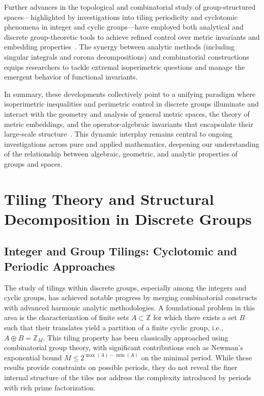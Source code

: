Further advances in the topological and combinatorial study of group-structured spaces—highlighted by investigations into tiling periodicity and cyclotomic phenomena in integer and cyclic groups—have employed both analytical and discrete group-theoretic tools to achieve refined control over metric invariants and embedding properties~\cite{ref52}. The synergy between analytic methods (including singular integrals and corona decompositions) and combinatorial constructions equips researchers to tackle extremal isoperimetric questions and manage the emergent behavior of functional invariants.

In summary, these developments collectively point to a unifying paradigm where isoperimetric inequalities and perimetric control in discrete groups illuminate and interact with the geometry and analysis of general metric spaces, the theory of metric embeddings, and the operator-algebraic invariants that encapsulate their large-scale structure~\cite{ref51,ref52,ref108}. This dynamic interplay remains central to ongoing investigations across pure and applied mathematics, deepening our understanding of the relationship between algebraic, geometric, and analytic properties of groups and spaces.

\section{Tiling Theory and Structural Decomposition in Discrete Groups}

\subsection{Integer and Group Tilings: Cyclotomic and Periodic Approaches}

The study of tilings within discrete groups, especially among the integers and cyclic groups, has achieved notable progress by merging combinatorial constructs with advanced harmonic analytic methodologies. A foundational problem in this area is the characterization of finite sets \( A \subset \mathbb{Z} \) for which there exists a set \( B \) such that their translates yield a partition of a finite cyclic group, i.e., \( A \oplus B = \mathbb{Z}_M \). This tiling property has been classically approached using combinatorial group theory, with significant contributions such as Newman's exponential bound \( M \leq 2^{\max(A)-\min(A)} \) on the minimal period. While these results provide constraints on possible periods, they do not reveal the finer internal structure of the tiles nor address the complexity introduced by periods with rich prime factorization.

